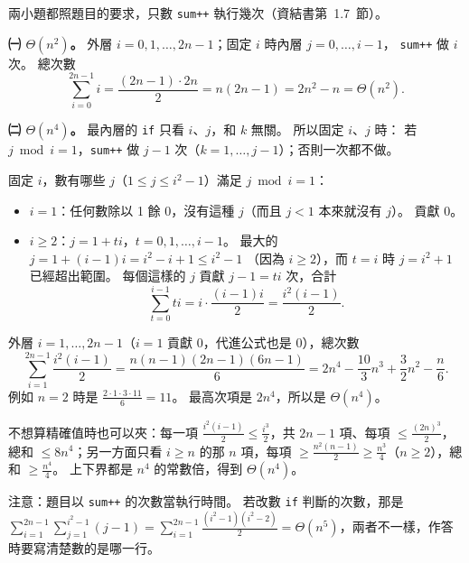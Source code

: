 \begin{pastsoln}
兩小題都照題目的要求，只數 \texttt{sum++} 執行幾次（資結書第~1.7~節）。

\textbf{㈠ $\Theta(n^2)$。} 外層 $i = 0, 1, \dots, 2n-1$；固定 $i$ 時內層 $j = 0, \dots, i-1$，
\texttt{sum++} 做 $i$ 次。 總次數
\[
\sum_{i=0}^{2n-1} i = \frac{(2n-1)\cdot 2n}{2} = n(2n-1) = 2n^2 - n = \Theta(n^2).
\]

\textbf{㈡ $\Theta(n^4)$。} 最內層的 \texttt{if} 只看 $i$、$j$，和 $k$ 無關。 所以固定 $i$、$j$ 時：
若 $j \bmod i = 1$，\texttt{sum++} 做 $j-1$ 次（$k = 1, \dots, j-1$）；否則一次都不做。

固定 $i$，數有哪些 $j$（$1 \le j \le i^2 - 1$）滿足 $j \bmod i = 1$：
\begin{itemize}
\item $i = 1$：任何數除以 1 餘 0，沒有這種 $j$（而且 $j < 1$ 本來就沒有 $j$）。 貢獻 0。
\item $i \ge 2$：$j = 1 + ti$，$t = 0, 1, \dots, i-1$。 最大的 $j = 1 + (i-1)i = i^2 - i + 1 \le i^2 - 1$
（因為 $i \ge 2$），而 $t = i$ 時 $j = i^2 + 1$ 已經超出範圍。 每個這樣的 $j$ 貢獻
$j - 1 = ti$ 次，合計
\[
\sum_{t=0}^{i-1} ti = i \cdot \frac{(i-1)i}{2} = \frac{i^2(i-1)}{2}.
\]
\end{itemize}
外層 $i = 1, \dots, 2n-1$（$i = 1$ 貢獻 0，代進公式也是 0），總次數
\[
\sum_{i=1}^{2n-1} \frac{i^2(i-1)}{2} = \frac{n(n-1)(2n-1)(6n-1)}{6} = 2n^4 - \frac{10}{3}n^3 + \frac{3}{2}n^2 - \frac{n}{6}.
\]
例如 $n = 2$ 時是 $\frac{2 \cdot 1 \cdot 3 \cdot 11}{6} = 11$。 最高次項是 $2n^4$，所以是
$\Theta(n^4)$。

不想算精確值時也可以夾：每一項 $\frac{i^2(i-1)}{2} \le \frac{i^3}{2}$，共 $2n - 1$ 項、每項
$\le \frac{(2n)^3}{2}$，總和 $\le 8n^4$；另一方面只看 $i \ge n$ 的那 $n$ 項，每項
$\ge \frac{n^2(n-1)}{2} \ge \frac{n^3}{4}$（$n \ge 2$），總和 $\ge \frac{n^4}{4}$。 上下界都是
$n^4$ 的常數倍，得到 $\Theta(n^4)$。

注意：題目以 \texttt{sum++} 的次數當執行時間。 若改數 \texttt{if} 判斷的次數，那是
$\sum_{i=1}^{2n-1} \sum_{j=1}^{i^2-1} (j-1) = \sum_{i=1}^{2n-1}\frac{(i^2-1)(i^2-2)}{2} = \Theta(n^5)$，兩者不一樣，作答時要寫清楚數的是哪一行。
\end{pastsoln}
